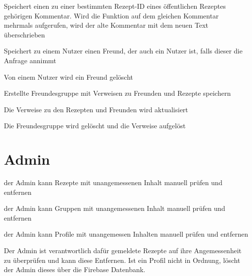    Speichert einen zu einer bestimmten Rezept-ID eines öffentlichen Rezeptes gehörigen Kommentar.
   Wird die Funktion auf dem gleichen Kommentar mehrmals aufgerufen, wird der alte Kommentar mit dem neuen Text überschrieben
      
  Speichert zu einem Nutzer einen Freund, der auch ein Nutzer ist, falls dieser die Anfrage annimmt
  
  Von einem Nutzer wird ein Freund gelöscht
  
  Erstellte Freundesgruppe mit Verweisen zu Freunden und Rezepte speichern
  
  Die Verweise zu den Rezepten und Freunden wird aktualisiert
  
  Die Freundesgruppe wird gelöscht und die Verweise aufgelöst
  
  
  \section{Admin}
  der Admin kann Rezepte mit unangemessenen Inhalt manuell prüfen und entfernen
  
  der Admin kann Gruppen mit unangemessenen Inhalt manuell prüfen und entfernen
  
   der Admin kann Profile mit unangemessen Inhalten manuell prüfen und entfernen
  
  Der Admin ist verantwortlich dafür gemeldete Rezepte auf ihre Angemessenheit zu überprüfen und kann diese Entfernen. Ist ein Profil nicht in Ordnung, löscht der Admin dieses über die Firebase Datenbank. 
